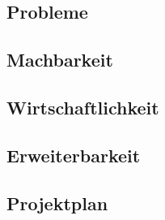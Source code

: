 \subsection{Probleme}


\subsection{Machbarkeit}


\subsection{Wirtschaftlichkeit}


\subsection{Erweiterbarkeit}


\subsection{Projektplan}
